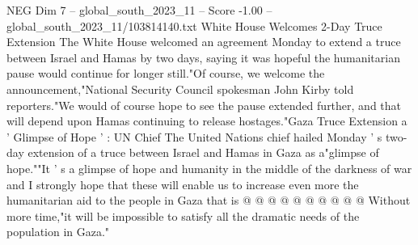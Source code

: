 \begin{textsample}{NEG Dim 7 – global\_south\_2023\_11 – Score -1.00 – global\_south\_2023\_11/103814140.txt}
White House Welcomes 2-Day Truce Extension The White House welcomed an agreement Monday to extend a truce between Israel and Hamas by two days, saying it was hopeful the humanitarian pause would continue for longer still."Of course, we welcome the announcement,"National Security Council spokesman John Kirby told reporters."We would of course hope to see the pause extended further, and that will depend upon Hamas continuing to release hostages."Gaza Truce Extension a ' Glimpse of Hope ' : UN Chief The United Nations chief hailed Monday ' s two-day extension of a truce between Israel and Hamas in Gaza as a"glimpse of hope.""It ' s a glimpse of hope and humanity in the middle of the darkness of war and I strongly hope that these will enable us to increase even more the humanitarian aid to the people in Gaza that is @ @ @ @ @ @ @ @ @ @ Without more time,"it will be impossible to satisfy all the dramatic needs of the population in Gaza."

\end{textsample}
